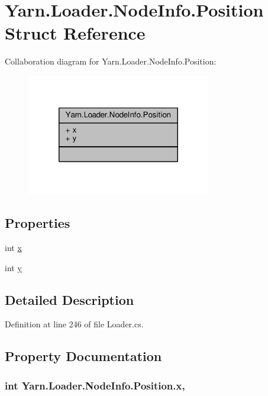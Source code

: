 \hypertarget{a00139}{\section{Yarn.\-Loader.\-Node\-Info.\-Position Struct Reference}
\label{a00139}
}


Collaboration diagram for Yarn.\-Loader.\-Node\-Info.\-Position\-:
\nopagebreak
\begin{figure}[H]
\begin{center}
\leavevmode
\includegraphics[width=228pt]{a00623}
\end{center}
\end{figure}
\subsection*{Properties}
\begin{DoxyCompactItemize}
\item 
int \hyperlink{a00139_a6b40110781090293fbcd2d6f7695ae4d}{x}
\item 
int \hyperlink{a00139_a390d560bd9faa3a32d8a0489c69be9e0}{y}
\end{DoxyCompactItemize}


\subsection{Detailed Description}


Definition at line 246 of file Loader.\-cs.



\subsection{Property Documentation}
\hypertarget{a00139_a6b40110781090293fbcd2d6f7695ae4d}{
\subsubsection[{x}]{\setlength{\rightskip}{0pt plus 5cm}int Yarn.\-Loader.\-Node\-Info.\-Position.\-x\hspace{0.3cm}{\ttfamily [get]}, {\ttfamily [set]}}}\label{a00139_a6b40110781090293fbcd2d6f7695ae4d}


